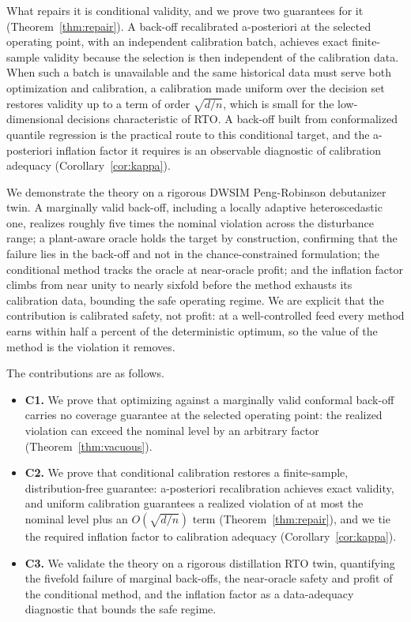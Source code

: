 \documentclass[journal]{IEEEtran}
\begin{document}
What repairs it is conditional validity, and we prove two guarantees for it
(Theorem~\ref{thm:repair}). A back-off recalibrated a-posteriori at the selected operating point,
with an independent calibration batch, achieves exact finite-sample validity because the
selection is then independent of the calibration data. When such a batch is unavailable and the
same historical data must serve both optimization and calibration, a calibration made uniform
over the decision set restores validity up to a term of order $\sqrt{d/n}$, which is small for
the low-dimensional decisions characteristic of RTO. A back-off built from conformalized quantile
regression \cite{romano2019} is the practical route to this conditional target, and the
a-posteriori inflation factor it requires is an observable diagnostic of calibration adequacy
(Corollary~\ref{cor:kappa}).

We demonstrate the theory on a rigorous DWSIM Peng-Robinson debutanizer twin. A marginally valid
back-off, including a locally adaptive heteroscedastic one, realizes roughly five times the
nominal violation across the disturbance range; a plant-aware oracle holds the target by
construction, confirming that the failure lies in the back-off and not in the chance-constrained
formulation; the conditional method tracks the oracle at near-oracle profit; and the inflation
factor climbs from near unity to nearly sixfold before the method exhausts its calibration data,
bounding the safe operating regime. We are explicit that the contribution is calibrated safety,
not profit: at a well-controlled feed every method earns within half a percent of the
deterministic optimum, so the value of the method is the violation it removes.

The contributions are as follows.
\begin{itemize}
\item \textbf{C1.} We prove that optimizing against a marginally valid conformal back-off carries
no coverage guarantee at the selected operating point: the realized violation can exceed the
nominal level by an arbitrary factor (Theorem~\ref{thm:vacuous}).
\item \textbf{C2.} We prove that conditional calibration restores a finite-sample,
distribution-free guarantee: a-posteriori recalibration achieves exact validity, and uniform
calibration guarantees a realized violation of at most the nominal level plus an
$O(\sqrt{d/n})$ term (Theorem~\ref{thm:repair}), and we tie the required inflation factor to
calibration adequacy (Corollary~\ref{cor:kappa}).
\item \textbf{C3.} We validate the theory on a rigorous distillation RTO twin, quantifying the
fivefold failure of marginal back-offs, the near-oracle safety and profit of the conditional
method, and the inflation factor as a data-adequacy diagnostic that bounds the safe regime.
\end{itemize}
\end{document}
